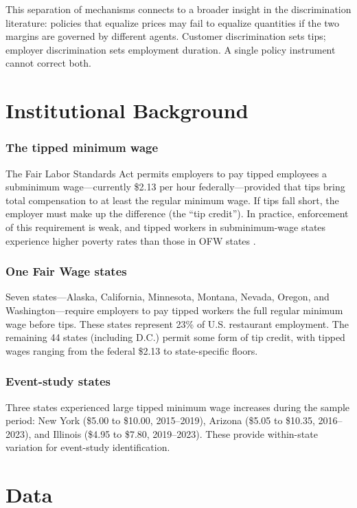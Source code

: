 \documentclass[12pt]{article}
\begin{document}
This separation of mechanisms connects to a broader insight in the discrimination literature: policies that equalize prices may fail to equalize quantities if the two margins are governed by different agents. Customer discrimination sets tips; employer discrimination sets employment duration. A single policy instrument cannot correct both.

\section{Institutional Background}

\subsubsection*{The tipped minimum wage} The Fair Labor Standards Act permits employers to pay tipped employees a subminimum wage---currently \$2.13 per hour federally---provided that tips bring total compensation to at least the regular minimum wage. If tips fall short, the employer must make up the difference (the ``tip credit''). In practice, enforcement of this requirement is weak, and tipped workers in subminimum-wage states experience higher poverty rates than those in OFW states \citep{allegretto2014tipped}.

\subsubsection*{One Fair Wage states} Seven states---Alaska, California, Minnesota, Montana, Nevada, Oregon, and Washington---require employers to pay tipped workers the full regular minimum wage before tips. These states represent 23\% of U.S. restaurant employment. The remaining 44 states (including D.C.) permit some form of tip credit, with tipped wages ranging from the federal \$2.13 to state-specific floors.

\subsubsection*{Event-study states} Three states experienced large tipped minimum wage increases during the sample period: New York (\$5.00 to \$10.00, 2015--2019), Arizona (\$5.05 to \$10.35, 2016--2023), and Illinois (\$4.95 to \$7.80, 2019--2023). These provide within-state variation for event-study identification.

\section{Data}
\end{document}
